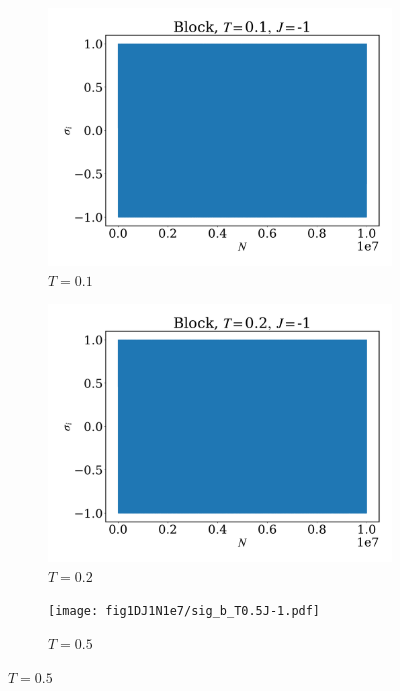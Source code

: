 \documentclass[12pt]{article}
\begin{document}
\begin{figure}
	\centering
	\begin{subfigure}[b]{0.49\textwidth}
		\centering
		\includegraphics[width=\textwidth]{fig1DJ1N1e7/sig_b_T0.1J-1.pdf}
		\caption{$T=0.1$}
	\end{subfigure}
	\hfill
	\begin{subfigure}[b]{0.49\textwidth}
		\centering
		\includegraphics[width=\textwidth]{fig1DJ1N1e7/sig_b_T0.2J-1.pdf}
		\caption{$T=0.2$}
	\end{subfigure}
	\hfill
	\begin{subfigure}[b]{0.49\textwidth}
		\centering
		\texttt{[image: fig1DJ1N1e7/sig\_b\_T0.5J-1.pdf]}
		\caption{$T=0.5$}
	\end{subfigure}

\end{figure}
\end{document}
